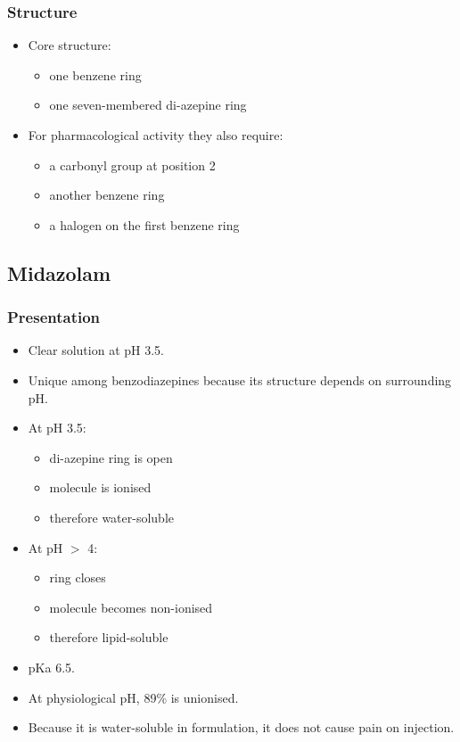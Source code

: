 \documentclass[11pt,a4paper]{article}
\begin{document}
\subsubsection{Structure}
\begin{itemize}
  \item Core structure:
  \begin{itemize}
    \item one benzene ring
    \item one seven-membered di-azepine ring
  \end{itemize}
  \item For pharmacological activity they also require:
  \begin{itemize}
    \item a carbonyl group at position 2
    \item another benzene ring
    \item a halogen on the first benzene ring
  \end{itemize}
\end{itemize}

\subsection{Midazolam}

\subsubsection{Presentation}
\begin{itemize}
  \item Clear solution at pH 3.5.
  \item Unique among benzodiazepines because its structure depends on surrounding pH.
  \item At pH 3.5:
  \begin{itemize}
    \item di-azepine ring is open
    \item molecule is ionised
    \item therefore water-soluble
  \end{itemize}
  \item At pH $>$ 4:
  \begin{itemize}
    \item ring closes
    \item molecule becomes non-ionised
    \item therefore lipid-soluble
  \end{itemize}
  \item pKa 6.5.
  \item At physiological pH, 89\% is unionised.
  \item Because it is water-soluble in formulation, it does not cause pain on injection.
\end{itemize}
\end{document}
